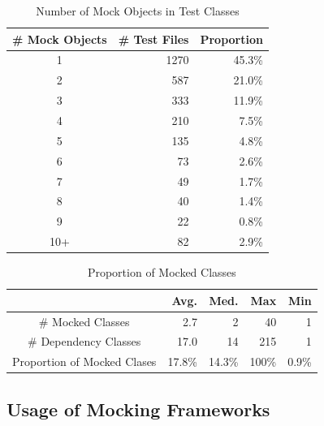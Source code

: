 \begin{table}

\caption{Number of Mock Objects in Test Classes}
\small

\label{table:num}
\centering
\begin{tabular}{|c|r|r|}
\hline
\# Mock Objects & \# Test Files & Proportion\\
\hline
1&1270 & 45.3\%\\
2&587 & 21.0\%\\
3&333 & 11.9\%\\
4&210 & 7.5\%\\
5&135 & 4.8\%\\
6&73 & 2.6\%\\
7&49 & 1.7\%\\
8&40 & 1.4\%\\
9&22 & 0.8\%\\
10+&82 & 2.9\%\\
\hline
\end{tabular}

\end{table}


\begin{table}
\caption{Proportion of Mocked Classes}
\small
\label{table:prop}
\centering
\begin{tabular}{|c|r|r|r|r|}
\hline
&Avg. & Med. & Max & Min\\
\hline
\# Mocked Classes &2.7&2&40&1\\
\# Dependency Classes &17.0&14&215&1\\
Proportion of Mocked Clases &17.8\%&14.3\%&100\%&0.9\%\\
\hline
\end{tabular}

\end{table}


\subsection{Usage of Mocking Frameworks}
\label{subsec:usage}



